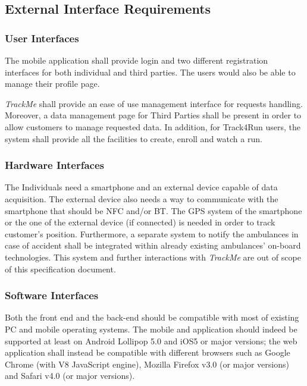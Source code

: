 \documentclass[a4paper]{article}
\begin{document}
    \subsection{External Interface Requirements}
        
        \subsubsection{User Interfaces}
        
        The mobile application shall provide login and two different registration interfaces for both individual and third parties. The users would also be able to manage their profile page.
        
        \textit{TrackMe} shall provide an ease of use management interface for requests handling. Moreover, a data management page for Third Parties shall be present in order to allow customers to manage requested data.
        In addition, for Track4Run users, the system shall provide all the facilities to create, enroll and watch a run.
        
        \subsubsection{Hardware Interfaces}
        The Individuals need a smartphone and an external device capable of data acquisition. The external device also needs a way to communicate with the smartphone that should be NFC and/or BT.
        The GPS system of the smartphone or the one of the external device (if connected) is needed in order to track customer's position.
        Furthermore, a separate system to notify the ambulances in case of accident shall be integrated within already existing ambulances' on-board technologies. This system and further interactions with \textit{TrackMe} are out of scope of this specification document.
        
        \subsubsection{Software Interfaces}
        Both the front end and the back-end should be compatible with most of existing PC and mobile operating systems. The mobile and application should indeed be supported at least on Android Lollipop 5.0 and iOS5 or major versions; the web application shall instead be compatible with different browsers such as Google Chrome (with V8 JavaScript engine), Mozilla Firefox v3.0 (or major versions) and Safari v4.0 (or major versions).
        
\end{document}
